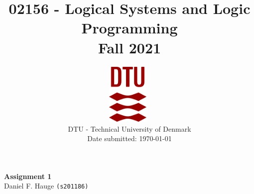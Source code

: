 \documentclass[a4paper]{article}
\begin{document}
\title{02156 - Logical Systems and Logic Programming\\Fall 2021}
\author{
\includegraphics[width=0.15\textwidth]{images/dtu.eps}~\\[1cm]
    DTU - Technical University of Denmark
    \\[0.5cm]
    Date submitted: \today
    \\
}
\date{} %
\color{black}
\maketitle
\begin{center}
{ \huge \bfseries Assignment 1}\\

\vspace{.25cm}
Daniel F. Hauge \texttt{(s201186)}\\


\vspace{.25cm}
\end{center}


\medskip
\newpage


\end{document}
